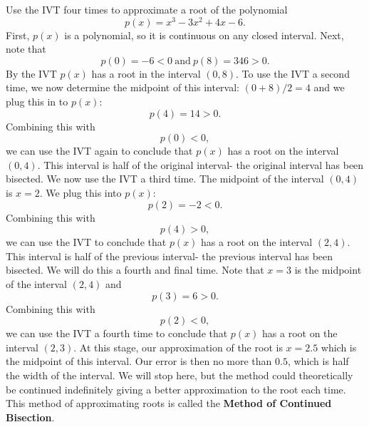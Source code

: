 \documentclass{ximera}
\begin{document}
\begin{example}[example 5]
Use the IVT four times to approximate a root of the polynomial 
\[p(x) = x^3 - 3x^2 + 4x - 6.\]
First, $p(x)$ is a polynomial, so it is continuous on any closed interval.
Next, note that 
\[p(0) = -6 < 0 \ \text{and} \ p(8) = 346 > 0.\]
By the IVT $p(x)$ has a root in the interval $(0, 8)$. 
To use the IVT a second time, we now determine the midpoint of this interval: $(0+8)/2 = 4$ and we 
plug this in to $p(x)$:
\[p(4) =  14 > 0.\]
Combining this with
\[p(0) < 0,\]
we can use the IVT again to conclude that $p(x)$ has a root on the interval $(0, 4)$. 
This interval is half of the original interval- the original interval has been bisected. 
We now use the IVT a third time. The midpoint of the interval $(0, 4)$ is $x=2$. We plug this into $p(x)$:
\[p(2) =  -2 < 0.\]
Combining this with
\[p(4) > 0,\]
we can use the IVT to conclude that $p(x)$ has a root on the interval $(2,4)$. 
This interval is half of the previous interval- the previous interval has been bisected. 
We will do this a fourth and final time. Note that $x = 3$ is the midpoint of the interval $(2,4)$ and
\[p(3) = 6 > 0.\]
Combining this with
\[p(2) < 0,\]
we can use the IVT a fourth time to conclude that $p(x)$ has a root on the interval $(2, 3)$. 
At this stage, our approximation of the root is $x = 2.5$ which is the midpoint of this interval. 
Our error is then no more than $0.5$, which is half the width of the interval.
We will stop here, but the method could theoretically be continued indefinitely giving a better 
approximation to the root each time. This method of approximating roots is called the 
\textbf{Method of Continued Bisection}.
\end{example}




\begin{center}
\begin{foldable}
\end{foldable}
\end{center}
\end{document}
